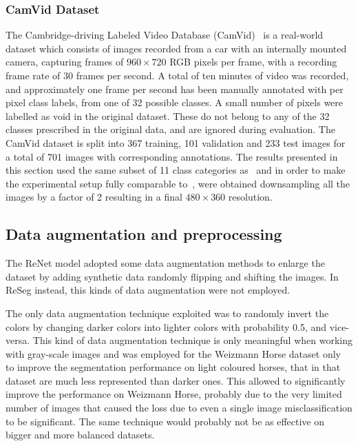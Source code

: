 \subsubsection{CamVid Dataset}
The Cambridge-driving Labeled Video Database (CamVid)~\cite{
Brostow2010semantic} is a real-world dataset which consists of images recorded
from a car with an internally mounted camera, capturing frames of $960 \times
720$ RGB pixels per frame, with a recording frame rate of 30 frames per second.
A total of ten minutes of video was recorded, and approximately one frame per
second has been manually annotated with per pixel class labels, from one of 32
possible classes. A small number of pixels were labelled as void in the
original dataset. These do not belong to any of the 32 classes prescribed in
the original data, and are ignored during evaluation. The CamVid dataset is
split into 367 training, 101 validation and 233 test images for a total of 701
images with corresponding annotations. The results presented in this section
used the same subset of 11 class categories
as~\cite{badrinarayanan2015segnet} and in order to make the experimental setup
fully comparable to~\cite{badrinarayanan2015segnet}, were obtained downsampling
all the images by a factor of 2 resulting in a final $480 \times 360$
resolution.

\subsection{Data augmentation and preprocessing}\label{sec:data_preprocessing}

The ReNet model adopted some data augmentation methods to enlarge the dataset
by adding synthetic data randomly flipping and shifting the images. In ReSeg
instead, this kinds of data augmentation were not employed.

The only data augmentation technique exploited was to randomly invert the
colors by changing darker colors into lighter colors with probability 0.5, and
vice-versa. This kind of data augmentation technique is only meaningful when
working with gray-scale images and was employed for the Weizmann Horse dataset
only to improve the segmentation performance on light coloured horses, that in
that dataset are much less represented than darker ones. This allowed to
significantly improve the performance on Weizmann Horse, probably due to the
very limited number of images that caused the loss due to even a single image
misclassification to be significant. The same technique would probably not be
as effective on bigger and more balanced datasets.

